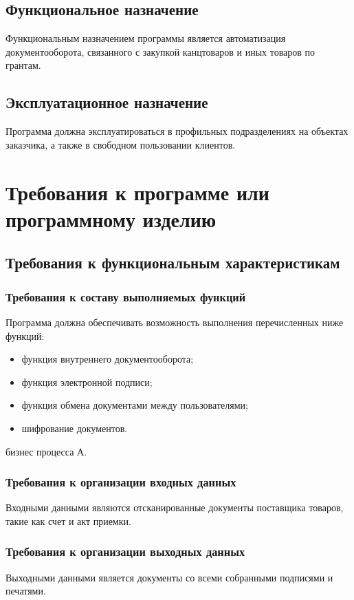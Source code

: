 \documentclass[14pt]{extarticle}
\begin{document}
\subsection{Функциональное назначение}
Функциональным назначением программы является автоматизация документооборота, связанного с закупкой канцтоваров и иных товаров по грантам.

\subsection{Эксплуатационное назначение}
Программа должна эксплуатироваться в профильных подразделениях на объектах заказчика, а также в свободном пользовании клиентов.

\newpage

\section{Требования к программе или программному изделию}
\subsection{Требования к функциональным характеристикам}
\subsubsection{Требования к составу выполняемых функций}
Программа должна обеспечивать возможность выполнения перечисленных ниже функций:\par
\begin{itemize} 
    \item функция внутреннего документооборота;
    \item функция электронной подписи;
    \item функция обмена документами между пользователями;
    \item шифрование документов.
\end{itemize}
 бизнес процесса А.

\subsubsection{Требования к организации входных данных}
Входными данными являются отсканированные документы поставщика товаров, такие как счет и акт приемки.
  
\subsubsection{Требования к организации выходных данных}
Выходными данными является документы со всеми собранными подписями и печатями.
\end{document}
